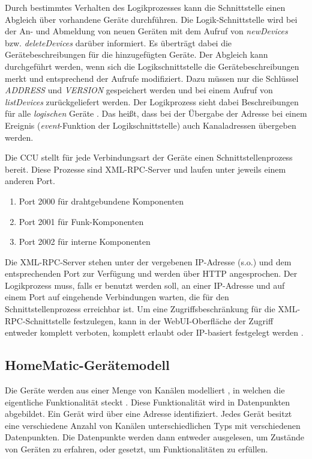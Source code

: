 Durch bestimmtes Verhalten des Logikprozesses kann die Schnittstelle einen Abgleich über vorhandene
Geräte durchführen.
Die Logik-Schnittstelle wird bei der An- und Abmeldung von neuen Geräten mit dem Aufruf von \emph{newDevices}
bzw. \emph{deleteDevices} \cite{homematic_xmlrpc} darüber informiert.
Es überträgt dabei die Gerätebeschreibungen für die hinzugefügten Geräte.
Der Abgleich kann durchgeführt werden, wenn sich die Logikschnittstelle die Gerätebeschreibungen
merkt \cite[Seite 22]{homematic_xmlrpc} und entsprechend der Aufrufe modifiziert.
Dazu müssen nur die Schlüssel \emph{ADDRESS} und \emph{VERSION} gespeichert werden und bei einem
Aufruf von \emph{listDevices} zurückgeliefert werden.
Der Logikprozess sieht dabei Beschreibungen für alle \emph{logischen} Geräte \cite[Seite 3]{homematic_xmlrpc}.
Das heißt, dass  bei der Übergabe der Adresse bei einem Ereignis (\emph{event}-Funktion der
Logikschnittstelle) auch Kanaladressen übergeben werden.

Die CCU stellt für jede Verbindungsart der Geräte einen Schnittstellenprozess bereit.
Diese Prozesse sind XML-RPC-Server und laufen unter jeweils einem anderen Port.
\begin{enumerate}
\item Port 2000 für drahtgebundene Komponenten
\item Port 2001 für Funk-Komponenten
\item Port 2002 für interne Komponenten
\end{enumerate}
Die XML-RPC-Server stehen unter der vergebenen IP-Adresse (s.o.) und dem entsprechenden Port
zur Verfügung und werden über HTTP angesprochen.
Der Logikprozess muss, falls er benutzt werden soll, an einer IP-Adresse und auf einem Port auf
eingehende Verbindungen warten, die für den Schnittstellenprozess erreichbar ist.
Um eine Zugriffsbeschränkung für die XML-RPC-Schnittstelle festzulegen, kann in der WebUI-Oberfläche
der Zugriff entweder komplett verboten, komplett erlaubt oder IP-basiert festgelegt werden \cite[Seite 92]{homematic_webui_manual}.

\subsection{HomeMatic-Gerätemodell}
\label{gru_hm_obj}

Die Geräte werden aus einer Menge von Kanälen modelliert \cite[Seite 13]{hmscript2}, in welchen
die eigentliche Funktionalität steckt \cite[Seite 16]{hmscript2}.
Diese Funktionalität wird in Datenpunkten abgebildet.
Ein Gerät wird über eine Adresse identifiziert.
Jedes Gerät besitzt eine verschiedene Anzahl von Kanälen unterschiedlichen Typs mit
verschiedenen Datenpunkten.
Die Datenpunkte werden dann entweder ausgelesen, um Zustände von Geräten zu erfahren, oder gesetzt,
um Funktionalitäten zu erfüllen.

